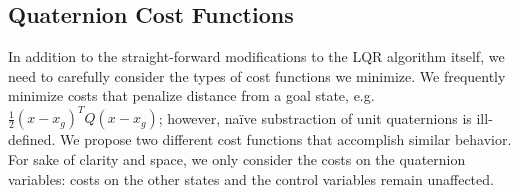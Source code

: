 \documentclass{svproc}
\newcommand{\half}{\frac{1}{2}}
\newcommand{\traj}[2][N]{#2_{0:{#1}}}
\begin{document}
    
    \subsection{Quaternion Cost Functions} \label{sec:cost_functions}
        In addition to the straight-forward modifications to the LQR algorithm itself, we need to carefully consider the types of cost functions we minimize. We frequently minimize costs that penalize distance from a goal state, e.g. $\half (x-x_g)^T Q (x-x_g)$; however, na\"ive substraction of unit quaternions is ill-defined. We propose two different cost functions that accomplish similar behavior. 
        For sake of clarity and space, we only consider the costs on the quaternion variables: costs on the other states and the control variables remain unaffected.
        
\end{document}
